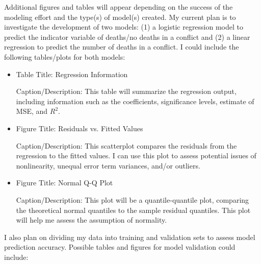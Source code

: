 \documentclass{article}
\begin{document}
Additional figures and tables will appear depending on the success of the modeling effort and the type(s) of model(s) created.  My current plan is to investigate the development of two models: (1) a logistic regression model to predict the indicator variable of deaths/no deaths in a conflict and (2) a linear regression to predict the number of deaths in a conflict.  I could include the following tables/plots for both models:

\begin{itemize}
\item Table Title: Regression Information

Caption/Description: This table will summarize the regression output, including information such as the coefficients, significance levels, estimate of MSE, and $R^2$.
\item Figure Title: Residuals vs. Fitted Values

Caption/Description: This scatterplot compares the residuals from the regression to the fitted values.  I can use this plot to assess potential issues of nonlinearity, unequal error term variances, and/or outliers.

\item Figure Title: Normal Q-Q Plot

Caption/Description: This plot will be a quantile-quantile plot, comparing the theoretical normal quantiles to the sample residual quantiles.  This plot will help me assess the assumption of normality.
\end{itemize}
I also plan on dividing my data into training and validation sets to assess model prediction accuracy. Possible tables and figures for model validation could include:
\end{document}
